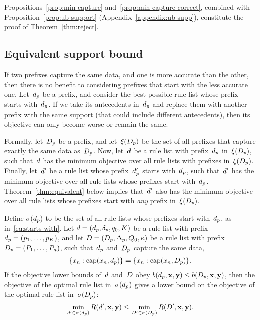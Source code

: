 \begin{arxiv}
Propositions~\ref{prop:min-capture} and~\ref{prop:min-capture-correct},
combined with Proposition~\ref{prop:ub-support} (Appendix~\ref{appendix:ub-supp}),
constitute the proof of Theorem~\ref{thm:reject}.
\end{arxiv}

\subsection{Equivalent support bound}
\label{sec:equivalent}

If two prefixes capture the same data, and one is more accurate than the other,
then there is no benefit to considering prefixes that start with the less accurate one.
%
Let~$d_p$ be a prefix,
and consider the best possible rule list whose prefix starts with~$d_p$.
%
If we take its antecedents in~$d_p$ and replace them with another prefix
with the same support (that could include different antecedents),
then its objective can only become worse or remain the same.

Formally, let~$D_p$ be a prefix, and let~$\xi(D_p)$ be the set
of all prefixes that capture exactly the same data as~$D_p$.
%
Now, let~${d}$ be a rule list with prefix~$d_p$
in~$\xi(D_p)$, such that~${d}$ has the minimum objective
over all rule lists with prefixes in~$\xi(D_p)$.
%
Finally, let~${d}'$ be a rule list whose prefix~$d_p'$
starts with~$d_p$, such that~${d}'$ has the minimum objective
over all rule lists whose prefixes start with~$d_p$.
%
Theorem~\ref{thm:equivalent} below implies that~${d}'$ also has
the minimum objective over all rule lists whose prefixes start with
\emph{any} prefix in~$\xi(D_p)$.

\begin{theorem}
\label{thm:equivalent}
Define $\sigma(d_p)$ to be the set of all rule lists
whose prefixes start with~$d_p$, as in~\eqref{eq:starts-with}.
%
Let ${{d} = (d_p, \delta_p, q_0, K)}$
be a rule list with prefix ${d_p = (p_1, \dots, p_K)}$,
and let ${{D} = (D_p, \Delta_p, Q_0, \kappa)}$
be a rule list with prefix ${D_p = (P_1, \dots, P_{\kappa})}$,
such that~$d_p$ and~$D_p$ capture the same data,~\ie
\begin{align}
\{x_n : \textnormal{cap}(x_n, d_p)\} = \{x_n : \textnormal{cap}(x_n, D_p)\}.
\end{align}
%
If the objective lower bounds of~${d}$ and~${D}$
obey ${b(d_p, \mathbf{x}, \mathbf{y}) \le b(D_p, \mathbf{x}, \mathbf{y})}$,
then the objective of the optimal rule list in~$\sigma(d_p)$ gives a
lower bound on the objective of the optimal rule list in~$\sigma(D_p)$:
\begin{align}
\min_{{d}' \in \sigma(d_p)} R({d}', \mathbf{x}, \mathbf{y})
\le \min_{{D}' \in \sigma(D_p)} R({D}', \mathbf{x}, \mathbf{y}).
\label{eq:permutation}
\end{align}
\end{theorem}

